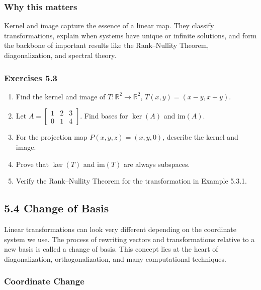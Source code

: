 \documentclass[
  12pt,
  a4paper,
]{article}
\begin{document}
\subsubsection{Why this matters}\label{why-this-matters-18}

Kernel and image capture the essence of a linear map. They classify
transformations, explain when systems have unique or infinite solutions,
and form the backbone of important results like the Rank--Nullity
Theorem, diagonalization, and spectral theory.

\subsubsection{Exercises 5.3}\label{exercises-53}

\begin{enumerate}
\def\labelenumi{\arabic{enumi}.}
\item
  Find the kernel and image of \(T:\mathbb{R}^2 \to \mathbb{R}^2\),
  \(T(x,y) = (x-y, x+y)\).
\item
  Let \(A = \begin{bmatrix} 1 & 2 & 3 \\ 0 & 1 & 4 \end{bmatrix}\). Find
  bases for \(\ker(A)\) and \(\text{im}(A)\).
\item
  For the projection map \(P(x,y,z) = (x,y,0)\), describe the kernel and
  image.
\item
  Prove that \(\ker(T)\) and \(\text{im}(T)\) are always subspaces.
\item
  Verify the Rank--Nullity Theorem for the transformation in Example
  5.3.1.
\end{enumerate}

\subsection{5.4 Change of Basis}\label{54-change-of-basis}

Linear transformations can look very different depending on the
coordinate system we use. The process of rewriting vectors and
transformations relative to a new basis is called a change of basis.
This concept lies at the heart of diagonalization, orthogonalization,
and many computational techniques.

\subsubsection{Coordinate Change}\label{coordinate-change}
\end{document}
